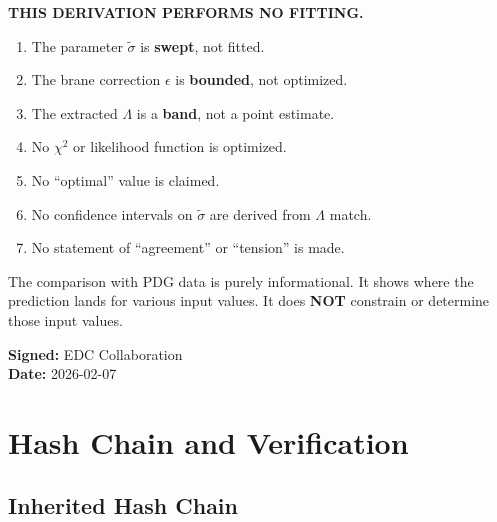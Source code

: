 \documentclass[11pt,a4paper]{article}
\theoremstyle{definition}
\begin{document}
\begin{nofitbox}
\textbf{THIS DERIVATION PERFORMS NO FITTING.}

\begin{enumerate}
  \item The parameter $\tilde{\sigma}$ is \textbf{swept}, not fitted.
  \item The brane correction $\epsilon$ is \textbf{bounded}, not optimized.
  \item The extracted $\Lambda$ is a \textbf{band}, not a point estimate.
  \item No $\chi^2$ or likelihood function is optimized.
  \item No ``optimal'' value is claimed.
  \item No confidence intervals on $\tilde{\sigma}$ are derived from $\Lambda$ match.
  \item No statement of ``agreement'' or ``tension'' is made.
\end{enumerate}

The comparison with PDG data is purely informational.
It shows where the prediction lands for various input values.
It does \textbf{NOT} constrain or determine those input values.

\textbf{Signed:} EDC Collaboration \\
\textbf{Date:} 2026-02-07
\end{nofitbox}

\section{Hash Chain and Verification}
\label{sec:hash-chain}

\subsection{Inherited Hash Chain}
\label{subsec:inherited-chain}
\end{document}
